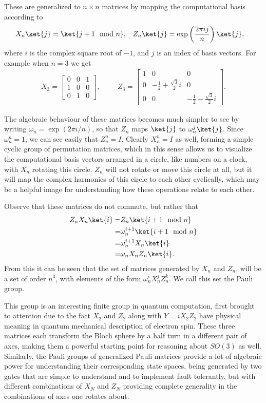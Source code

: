 These are generalized to $n\times n$ matrices by mapping the computational basis according to
\begin{align*}
X_n\ket{j} = \ket{j+1\mod n},
&&&
Z_n\ket{j} = \exp\left(\frac{2\pi ij}{n}\right)\ket{j},
\end{align*} where $i$ is the complex square root of $-1$, and $j$ is an index of basis vectors. For example when $n = 3$ we get
\begin{align*}
X_3 = \begin{bmatrix}
0 & 0 & 1 \\
1 & 0 & 0 \\
0 & 1 & 0
\end{bmatrix},
&&&
Z_3 = \begin{bmatrix}
1 & 0 & 0 \\
0 & -\frac{1}{2} + \frac{\sqrt{3}}{2}i & 0 \\
0 & 0 & -\frac{1}{2} - \frac{\sqrt{3}}{2}i
\end{bmatrix}.
\end{align*}

The algebraic behaviour of these matrices becomes much simpler to see by writing $\omega_n = \exp(2\pi i/n)$, so that $Z_n$ maps $\ket{j}$ to $\omega_n^j\ket{j}$. Since $\omega_n^n = 1$, we can see easily that $Z_n^n = I$. Clearly $X_n^n = I$ as well, forming a simple cyclic group of permutation matrices, which in this sense allows us to visualize the computational basis vectors arranged in a circle, like numbers on a clock, with $X_n$ rotating this circle. $Z_n$ will not rotate or move this circle at all, but it will map the complex harmonics of this circle to each other cyclically, which may be a helpful image for understanding how these operations relate to each other.

Observe that these matrices do not commute, but rather that
\begin{align*}
	Z_nX_n\ket{i}
	=& Z_n\ket{i+1\mod n}
	\\=& \omega_n^{i+1}\ket{i+1\mod n}
	\\=& \omega_n^{i+1}X_n\ket{i}
	\\=& \omega_nX_nZ_n\ket{i}.
\end{align*}
From this it can be seen that the set of matrices generated by $X_n$ and $Z_n$, will be a set of order $n^3$, with elements of the form $\omega_n^iX_n^jZ_n^k$. We call this set the Pauli group.

This group is an interesting finite group in quantum computation, first brought to attention due to the fact $X_2$ and $Z_2$ along with $Y = iX_2Z_2$ have physical meaning in quantum mechanical description of electron spin. These three matrices each transform the Bloch sphere by a half turn in a different pair of axes, making them a powerful starting point for reasoning about $SO(3)$ as well. Similarly, the Pauli groups of generalized Pauli matrices provide a lot of algebraic power for understanding their corresponding state spaces, being generated by two gates that are simple to understand and to implement fault tolerantly, but with different combinations of $X_N$ and $Z_N$ providing complete generality in the combinations of axes one rotates about.

